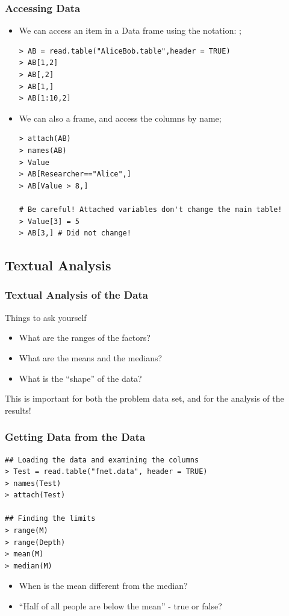 \documentclass[10pt]{beamer}
\begin{document}
\begin{frame}
  \frametitle{Accessing Data}
  \begin{itemize}
  \item We can access an item in a Data frame using the notation:
    ;
{\small
\begin{verbatim}
> AB = read.table("AliceBob.table",header = TRUE)
> AB[1,2]
> AB[,2]
> AB[1,]
> AB[1:10,2]
\end{verbatim}}

  \medskip 
  \item We can also  a frame, and access the columns
  by name;
{\small
\begin{verbatim}
> attach(AB)
> names(AB)
> Value
> AB[Researcher=="Alice",]
> AB[Value > 8,]

# Be careful! Attached variables don't change the main table!
> Value[3] = 5
> AB[3,] # Did not change!
\end{verbatim}}
  \end{itemize}
\end{frame}

\subsection{Textual Analysis}

\begin{frame}
  \frametitle{Textual Analysis of the Data}
  \begin{block}{Things to ask yourself}
    \begin{itemize}
    \item What are the ranges of the factors?
    \item What are the means and the medians? 
    \item What is the ``shape'' of the data?
    \end{itemize}
  \end{block}
  \medskip
  \begin{center}
    This is important for both the problem data set, and for the
    analysis of the results!
  \end{center}
\end{frame}

\begin{frame}
  \frametitle{Getting Data from the Data}
  \begin{block}{}
\begin{verbatim}
## Loading the data and examining the columns
> Test = read.table("fnet.data", header = TRUE)
> names(Test)
> attach(Test)

## Finding the limits
> range(M)
> range(Depth)
> mean(M)
> median(M)
\end{verbatim}
  \end{block}
  
  \begin{itemize}
  \item When is the mean different from the median?
  \item ``Half of all people are below the mean'' - true or false?
  \end{itemize}
\end{frame}
\end{document}
